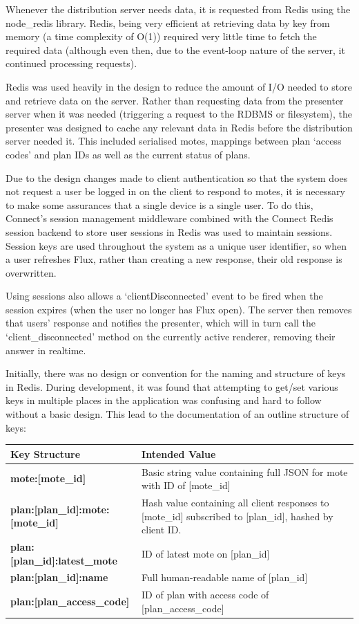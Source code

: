 \documentclass[a4papert,11pt,notitlepage]{article}
\begin{document}
Whenever the distribution server needs data, it is requested from Redis using the node\_redis\cite{noderedis:web} library. Redis, being very efficient at retrieving data by key from memory (a time complexity of O(1)) required very little time to fetch the required data (although even then, due to the event-loop nature of the server, it continued processing requests).

Redis was used heavily in the design to reduce the amount of I/O needed to store and retrieve data on the server. Rather than requesting data from the presenter server when it was needed (triggering a request to the RDBMS or filesystem), the presenter was designed to cache any relevant data in Redis before the distribution server needed it. This included serialised motes, mappings between plan `access codes' and plan IDs as well as the current status of plans.

Due to the design changes made to client authentication so that the system does not request a user be logged in on the client to respond to motes, it is necessary to make some assurances that a single device is a single user. To do this, Connect's session management middleware combined with the Connect Redis\cite{connectredis:web} session backend to store user sessions in Redis was used to maintain sessions. Session keys are used throughout the system as a unique user identifier, so when a user refreshes Flux, rather than creating a new response, their old response is overwritten.

Using sessions also allows a `clientDisconnected' event to be fired when the session expires (when the user no longer has Flux open). The server then removes that users' response and notifies the presenter, which will in turn call the `client\_disconnected' method on the currently active renderer, removing their answer in realtime.

Initially, there was no design or convention for the naming and structure of keys in Redis. During development, it was found that attempting to get/set various keys in multiple places in the application was confusing and hard to follow without a basic design. This lead to the documentation of an outline structure of keys:

\begin{tabular}{ l p{290pt} }
  \textbf{Key Structure} & \textbf{Intended Value} \\ \hline
  \textbf{mote:[mote\_id]} & Basic string value containing full JSON for mote with ID of [mote\_id] \\
  \textbf{plan:[plan\_id]:mote:[mote\_id]} & Hash value containing all client responses to [mote\_id] subscribed to [plan\_id], hashed by client ID. \\
  \textbf{plan:[plan\_id]:latest\_mote} & ID of latest mote on [plan\_id] \\
  \textbf{plan:[plan\_id]:name} & Full human-readable name of [plan\_id] \\
  \textbf{plan:[plan\_access\_code]} & ID of plan with access code of [plan\_access\_code] \\
\end{tabular}
\end{document}
